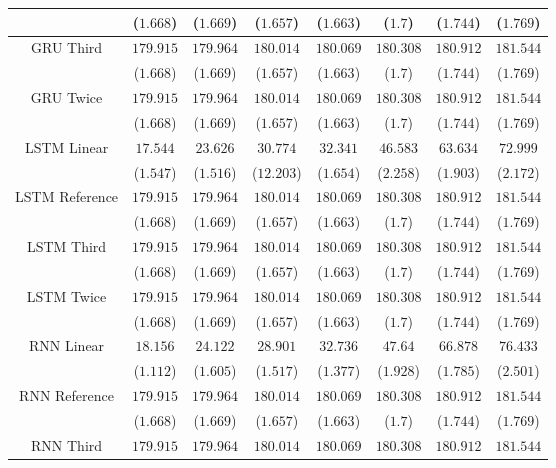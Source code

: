 \begin{table}[!ht]
{\begin{tabular}{|c|c|c|c|c|c|c|c|}
			 & ($1.668$) & ($1.669$) & ($1.657$) & ($1.663$) & ($1.7$) & ($1.744$) & ($1.769$) \\ \hline
			\multirow{2}{*}{GRU Third} & $179.915$ & $179.964$ & $180.014$ & $180.069$ & $180.308$ & $180.912$ & $181.544$ \\
			 & ($1.668$) & ($1.669$) & ($1.657$) & ($1.663$) & ($1.7$) & ($1.744$) & ($1.769$) \\ \hline
			\multirow{2}{*}{GRU Twice} & $179.915$ & $179.964$ & $180.014$ & $180.069$ & $180.308$ & $180.912$ & $181.544$ \\
			 & ($1.668$) & ($1.669$) & ($1.657$) & ($1.663$) & ($1.7$) & ($1.744$) & ($1.769$) \\ \hline
			\multirow{2}{*}{LSTM Linear} & $17.544$ & $23.626$ & $30.774$ & $32.341$ & $46.583$ & $63.634$ & $72.999$ \\
			 & ($1.547$) & ($1.516$) & ($12.203$) & ($1.654$) & ($2.258$) & ($1.903$) & ($2.172$) \\ \hline
			\multirow{2}{*}{LSTM Reference} & $179.915$ & $179.964$ & $180.014$ & $180.069$ & $180.308$ & $180.912$ & $181.544$ \\
			 & ($1.668$) & ($1.669$) & ($1.657$) & ($1.663$) & ($1.7$) & ($1.744$) & ($1.769$) \\ \hline
			\multirow{2}{*}{LSTM Third} & $179.915$ & $179.964$ & $180.014$ & $180.069$ & $180.308$ & $180.912$ & $181.544$ \\
			 & ($1.668$) & ($1.669$) & ($1.657$) & ($1.663$) & ($1.7$) & ($1.744$) & ($1.769$) \\ \hline
			\multirow{2}{*}{LSTM Twice} & $179.915$ & $179.964$ & $180.014$ & $180.069$ & $180.308$ & $180.912$ & $181.544$ \\
			 & ($1.668$) & ($1.669$) & ($1.657$) & ($1.663$) & ($1.7$) & ($1.744$) & ($1.769$) \\ \hline
			\multirow{2}{*}{RNN Linear} & $18.156$ & $24.122$ & $28.901$ & $32.736$ & $47.64$ & $66.878$ & $76.433$ \\
			 & ($1.112$) & ($1.605$) & ($1.517$) & ($1.377$) & ($1.928$) & ($1.785$) & ($2.501$) \\ \hline
			\multirow{2}{*}{RNN Reference} & $179.915$ & $179.964$ & $180.014$ & $180.069$ & $180.308$ & $180.912$ & $181.544$ \\
			 & ($1.668$) & ($1.669$) & ($1.657$) & ($1.663$) & ($1.7$) & ($1.744$) & ($1.769$) \\ \hline
			\multirow{2}{*}{RNN Third} & $179.915$ & $179.964$ & $180.014$ & $180.069$ & $180.308$ & $180.912$ & $181.544$ \\

\end{tabular}}
\end{table}
